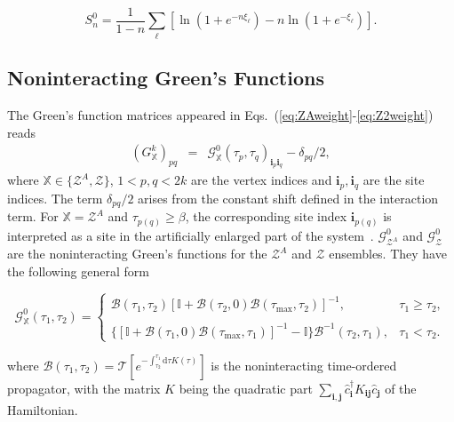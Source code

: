 \documentclass[12pt,onecolumn,english,prl,showpacs,nofootinbib]{revtex4-1}
\begin{document}
\begin{equation*}
S_{n}^{0} = \frac{1}{1-n} \sum_{\ell} \left[ \ln (1+e^{-n\xi_{\ell}}) - n \ln(1+e^{-\xi_{\ell}}) \right]. 
\end{equation*}


\subsection{Noninteracting Green's Functions}
The Green's function matrices appeared in Eqs.~(\ref{eq:ZAweight}-\ref{eq:Z2weight}) reads
\begin{eqnarray}
\left(G^{k}_{\mathbb{X}} \right) _{pq} & =&\mathcal{G}^{0}_{\mathbb{X}}(\tau_{p}, \tau_{q}) _{\mathbf{i}_{p}\mathbf{i}_{q} } - \delta_{pq}/2,
\label{eq:G}
\end{eqnarray}
where $\mathbb{X}\in \{ \mathcal{Z}^{A}, \mathcal{Z}\}$,  $1<p,q<2k$ are the vertex indices and $\mathbf{i}_{p},\mathbf{i}_{q}$ are the site indices. The term $\delta_{pq}/2$ arises from the constant shift defined in the interaction term. For $\mathbb{X}=\mathcal{Z}^{A}$ and $\tau_{p(q)} \ge \beta$, the corresponding site index $\mathbf{i}_{p(q)}$ is interpreted  as a site in the artificially enlarged part of the system~\cite{Broecker:2014ud}. $\mathcal{G}^{0}_{\mathcal{Z}^{A}}$ and $\mathcal{G}^{0}_{\mathcal{Z}}$ are the noninteracting Green's functions for the $\mathcal{Z}^{A}$  and $\mathcal{Z}$ ensembles. They have the following general form
\cite{Assaad:2008hx}

\begin{widetext}
\begin{equation}
\mathcal{G}^{0}_{\mathbb{X}}(\tau_{1}, \tau_{2})   =\begin{cases}
 \mathcal{B}(\tau_{1}, \tau_{2}) [\mathbb{I} + \mathcal{B}(\tau_{2}, 0)\mathcal{B}(\tau_{\max}, \tau_{2}) ]^{-1} , & \text{$\tau_{1}\ge \tau_{2}$}, \\ \\
 \{ [\mathbb{I} +    \mathcal{B}(\tau_{1}, 0)\mathcal{B}(\tau_{\max}, \tau_{1})]^{-1} -\mathbb{I}\}   \mathcal{B}^{-1}(\tau_{2},\tau_{1})  
    , & \text{$\tau_{1}< \tau_{2}$}.
  \end{cases}
\label{eq:nonintgf}  
\end{equation}
\end{widetext}
where $\mathcal{B}(\tau_{1}, \tau_{2})= \mathcal{T} [e^{-\int_{\tau_{2}}^{\tau_{1}} \mathrm{d}\tau K(\tau)}]$ is the noninteracting time-ordered propagator, with the matrix $K$ being the quadratic part $\sum_\mathbf{i,j} \hat{c}^{\dagger}_{\mathbf{i}} K_\mathbf{ij} \hat{c}_{\mathbf{j}}$ of the Hamiltonian. 
 
\end{document}
